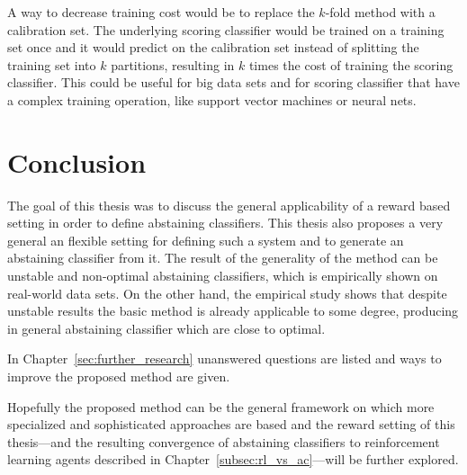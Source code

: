 \documentclass[twoside,11pt]{article}
\begin{document}
A way to decrease training cost would be to replace the
$k$-fold method with a calibration set.
The underlying scoring classifier would be trained on a
training set once and it would predict on the calibration
set instead of splitting the training set into $k$
partitions, resulting in $k$ times the cost of training
the scoring classifier.
This could be useful for big data sets and for scoring
classifier that have a complex training operation, like
support vector machines or neural nets.

\section{Conclusion}

The goal of this thesis was to discuss the general
applicability of a reward based setting in order to define
abstaining classifiers.
This thesis also proposes a very general an flexible
setting for defining such a system and to generate an
abstaining classifier from it.
The result of the generality of the method can be unstable
and non-optimal abstaining classifiers, which is
empirically shown on real-world data sets.
On the other hand, the empirical study shows that despite
unstable results the basic method is already applicable to
some degree, producing in general abstaining classifier
which are close to optimal.

In Chapter~\ref{sec:further_research} unanswered questions
are listed and ways to improve the proposed method are
given.

Hopefully the proposed method can be the general framework
on which more specialized and sophisticated approaches are
based and the reward setting of this thesis---and the
resulting convergence of abstaining classifiers to
reinforcement learning agents described in
Chapter~\ref{subsec:rl_vs_ac}---will be further explored.

\newpage
\end{document}
